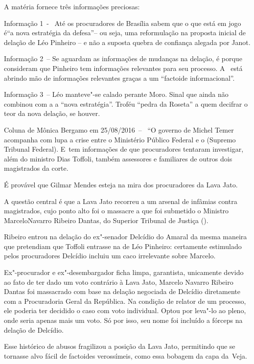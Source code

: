 A matéria fornece três informações preciosas:

Informação 1~-~ Até os procuradores de Brasília sabem que o que está em
jogo é``a nova estratégia da defesa''-- ou seja, uma reformulação na
proposta inicial de delação de Léo Pinheiro -- e não a suposta quebra de
confiança alegada por Janot.

Informação 2~-- Se aguardam as informações de mudanças na delação, é
porque consideram que Pinheiro tem informações relevantes para seu
processo. A~ está abrindo mão de informações relevantes graças a um
``factoide informacional''.

Informação 3~-- Léo manteve"-se calado perante Moro. Sinal que ainda não
combinou com a  a ``nova estratégia''. Troféu ``pedra da Roseta'' a
quem decifrar o teor da nova delação, se houver.

Coluna de Mônica Bergamo em 25/\allowbreak{}08/\allowbreak{}2016~-- ~``O governo de Michel Temer
acompanha com lupa a crise entre o Ministério Público Federal e o 
(Supremo Tribunal Federal). E~tem informações de que procuradores
tentaram investigar, além do ministro Dias Toffoli, também assessores e
familiares de outros dois magistrados da corte.

É provável que Gilmar Mendes esteja na mira dos procuradores da Lava
Jato.

A questão central é que a Lava Jato recorreu a um arsenal de infâmias
contra magistrados, cujo ponto alto foi o massacre a que foi submetido o
Ministro MarceloNavarro Ribeiro Dantas, do Superior Tribunal de Justiça
().

Ribeiro entrou na delação do ex"-senador Delcídio do Amaral da mesma
maneira que pretendiam que Toffoli entrasse na de Léo Pinheiro:
certamente estimulado pelos procuradores Delcídio incluiu um caco
irrelevante sobre Marcelo.

Ex"-procurador e ex"-desembargador ficha limpa, garantista, unicamente
devido ao fato de ter dado um voto contrário à Lava Jato, Marcelo
Navarro Ribeiro Dantas foi massacrado com base na delação negociada de
Delcídio diretamente com a Procuradoria Geral da República. Na condição
de relator de um processo, ele poderia ter decidido o caso com voto
individual. Optou por leva"-lo ao pleno, onde seria apenas mais um voto.
Só por isso, seu nome foi incluído a fórceps na delação de Delcídio.

Esse histórico de abusos fragilizou a posição da Lava Jato, permitindo
que se tornasse alvo fácil de factoides verossímeis, como essa bobagem
da capa da~Veja.

